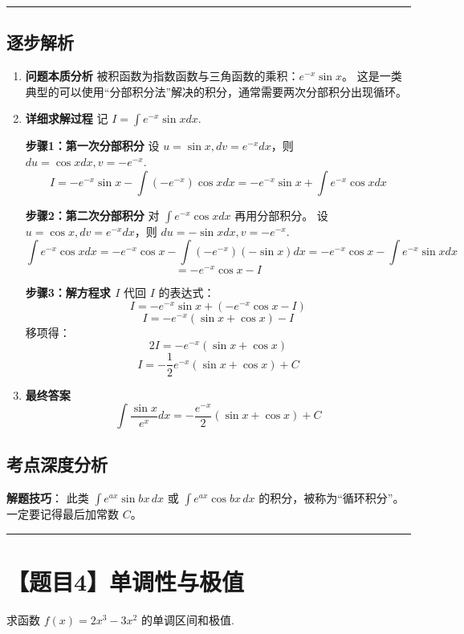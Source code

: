 \documentclass[12pt, a4paper]{article}
\newenvironment{redenv}{\color{red}}{}
\newenvironment{detailedanalysis}{%
    \color{red}
    \begin{enumerate}[label=\textbf{第\arabic*步：}, leftmargin=*, align=left, itemsep=1.5ex]
}{%
    \end{enumerate}
}
\newenvironment{conceptbox}{%
    \begin{tcolorbox}[colback=red!5, colframe=red!50!black, title=概念解析, fonttitle=\bfseries]
}{%
    \end{tcolorbox}
}
\newcommand{\problemrule}{\noindent\rule{\textwidth}{1.5pt}\vspace{-0.8em}}
\newcommand{\analysisrule}{\noindent\rule{\textwidth}{0.8pt}\vspace{-0.8em}}
\begin{document}
\begin{redenv}
\analysisrule
\subsection*{逐步解析}

\begin{detailedanalysis}
\item \textbf{问题本质分析}
被积函数为指数函数与三角函数的乘积：$e^{-x} \sin x$。
这是一类典型的可以使用“分部积分法”解决的积分，通常需要两次分部积分出现循环。

\item \textbf{详细求解过程}
记 $I = \int e^{-x} \sin x dx$.

\textbf{步骤1：第一次分部积分}
设 $u = \sin x, dv = e^{-x}dx$，则 $du = \cos x dx, v = -e^{-x}$.
\[ I = -e^{-x}\sin x - \int (-e^{-x})\cos x dx = -e^{-x}\sin x + \int e^{-x}\cos x dx \]

\textbf{步骤2：第二次分部积分}
对 $\int e^{-x}\cos x dx$ 再用分部积分。
设 $u = \cos x, dv = e^{-x}dx$，则 $du = -\sin x dx, v = -e^{-x}$.
\[ \int e^{-x}\cos x dx = -e^{-x}\cos x - \int (-e^{-x})(-\sin x) dx = -e^{-x}\cos x - \int e^{-x}\sin x dx \]
\[ = -e^{-x}\cos x - I \]

\textbf{步骤3：解方程求 $I$}
代回 $I$ 的表达式：
\[ I = -e^{-x}\sin x + (-e^{-x}\cos x - I) \]
\[ I = -e^{-x}(\sin x + \cos x) - I \]
移项得：
\[ 2I = -e^{-x}(\sin x + \cos x) \]
\[ I = -\frac{1}{2}e^{-x}(\sin x + \cos x) + C \]

\item \textbf{最终答案}
\[ \int \frac{\sin x}{e^x} dx = -\frac{e^{-x}}{2}(\sin x + \cos x) + C \]
\end{detailedanalysis}

\subsection*{考点深度分析}
\begin{conceptbox}
\textbf{解题技巧}：
此类 $\int e^{ax} \sin bx \, dx$ 或 $\int e^{ax} \cos bx \, dx$ 的积分，被称为“循环积分”。
一定要记得最后加常数 $C$。
\end{conceptbox}
\end{redenv}


\problemrule
\section*{【题目4】单调性与极值}
求函数 $f(x) = 2x^3 - 3x^2$ 的单调区间和极值.
\end{document}
